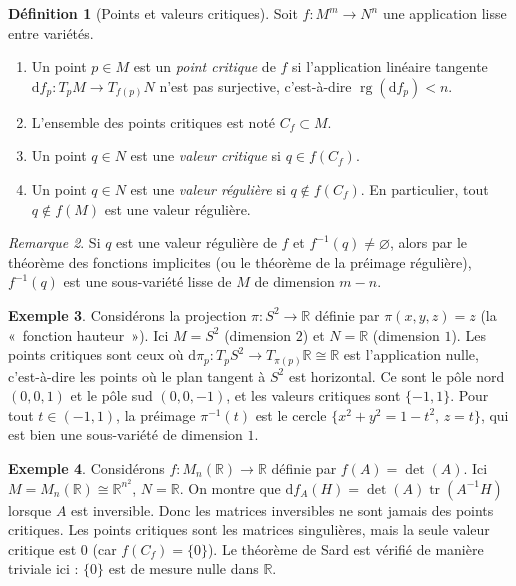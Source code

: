 \documentclass[12pt,a4paper,openany]{book}
\theoremstyle{definition}
\newtheorem{definition}{Définition}[chapter]
\newtheorem{exemple}[definition]{Exemple}
\theoremstyle{plain}
\theoremstyle{remark}
\newtheorem{remarque}[definition]{Remarque}
\newcommand{\R}{\mathbb{R}}
\DeclareMathOperator{\rg}{rg}
\newcommand{\dd}{\mathrm{d}}
\begin{document}
\begin{definition}[Points et valeurs critiques]\label{def:critique}
Soit $f \colon M^m \to N^n$ une application lisse entre variétés.
\begin{enumerate}[label=(\roman*)]
  \item Un point $p \in M$ est un \emph{point critique} de $f$ si l'application
  linéaire tangente $\dd f_p \colon T_pM \to T_{f(p)}N$ n'est pas surjective,
  c'est-à-dire $\rg(\dd f_p) < n$.
  \item L'ensemble des points critiques est noté $C_f \subset M$.
  \item Un point $q \in N$ est une \emph{valeur critique} si
  $q \in f(C_f)$.
  \item Un point $q \in N$ est une \emph{valeur régulière} si $q \notin f(C_f)$.
  En particulier, tout $q \notin f(M)$ est une valeur régulière.
\end{enumerate}
\end{definition}

\begin{remarque}\label{rem:reguliere-preimage}
Si $q$ est une valeur régulière de $f$ et $f^{-1}(q) \neq \varnothing$, alors
par le théorème des fonctions implicites (ou le théorème de la préimage
régulière), $f^{-1}(q)$ est une sous-variété lisse de $M$ de dimension $m - n$.
\end{remarque}

\begin{exemple}\label{ex:critique-projection}
Considérons la projection $\pi \colon S^2 \to \R$ définie par
$\pi(x,y,z) = z$ (la «~fonction hauteur~»). Ici $M = S^2$ (dimension $2$)
et $N = \R$ (dimension $1$). Les points critiques sont ceux où
$\dd\pi_p \colon T_pS^2 \to T_{\pi(p)}\R \cong \R$ est l'application nulle,
c'est-à-dire les points où le plan tangent à $S^2$ est horizontal. Ce sont
le pôle nord $(0,0,1)$ et le pôle sud $(0,0,-1)$, et les valeurs critiques
sont $\{-1, 1\}$. Pour tout $t \in (-1,1)$, la préimage $\pi^{-1}(t)$ est
le cercle $\{x^2 + y^2 = 1 - t^2,\, z = t\}$, qui est bien une sous-variété
de dimension $1$.
\end{exemple}

\begin{exemple}\label{ex:critique-determinant}
Considérons $f \colon M_{n}(\R) \to \R$ définie par $f(A) = \det(A)$. Ici
$M = M_n(\R) \cong \R^{n^2}$, $N = \R$. On montre que $\dd f_A(H) =
\det(A) \operatorname{tr}(A^{-1}H)$ lorsque $A$ est inversible. Donc les
matrices inversibles ne sont jamais des points critiques. Les points critiques
sont les matrices singulières, mais la seule valeur critique est $0$ (car
$f(C_f) = \{0\}$). Le théorème de Sard est vérifié de manière triviale ici :
$\{0\}$ est de mesure nulle dans $\R$.
\end{exemple}
\end{document}
